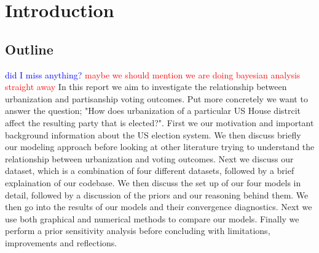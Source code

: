 \documentclass[12pt]{article}
\newcommand{\red}[1]{\textcolor{red}{#1}}
\newcommand{\blue}[1]{\textcolor{blue}{#1}}
\begin{document}











\thispagestyle{empty} %
\newpage

\tableofcontents
\newpage


\section{Introduction}
 
\subsection*{Outline}
\blue{did I miss anything?}
\red{maybe we should mention we are doing bayesian analysis straight away}
In this report we aim to investigate the relationship between urbanization and partisanship voting outcomes. Put more concretely we want to answer the question; "How does urbanization of a particular US House distrcit affect the resulting party that is elected?". First we our motivation and important background information about the US election system. 
We then discuss briefly our modeling approach before looking at other literature trying to understand the relationship between urbanization and voting outcomes. 
Next we discuss our dataset, which is a combination of four different datasets, followed by a brief explaination of our codebase. 
We then discuss the set up of our four models in detail, followed by a discussion of the priors and our reasoning behind them. We then go into the results of our models and their convergence diagnostics. Next we use both graphical and numerical methods to compare our models. Finally we perform a prior sensitivity analysis before concluding with limitations, improvements and reflections. 
\end{document}
